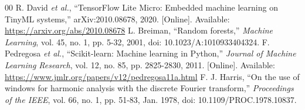 \documentclass[conference,a4paper]{template/IEEEtran}
\begin{document}
\begin{thebibliography}{00}
 R. David \textit{et al.}, ``TensorFlow Lite Micro: Embedded machine learning on TinyML systems,'' arXiv:2010.08678, 2020. [Online]. Available: \url{https://arxiv.org/abs/2010.08678}
 L. Breiman, ``Random forests,'' \textit{Machine Learning}, vol. 45, no. 1, pp. 5-32, 2001, doi: 10.1023/A:1010933404324.
 F. Pedregosa \textit{et al.}, ``Scikit-learn: Machine learning in Python,'' \textit{Journal of Machine Learning Research}, vol. 12, no. 85, pp. 2825-2830, 2011. [Online]. Available: \url{https://www.jmlr.org/papers/v12/pedregosa11a.html}
 F. J. Harris, ``On the use of windows for harmonic analysis with the discrete Fourier transform,'' \textit{Proceedings of the IEEE}, vol. 66, no. 1, pp. 51-83, Jan. 1978, doi: 10.1109/PROC.1978.10837.
\end{thebibliography}
\end{document}
